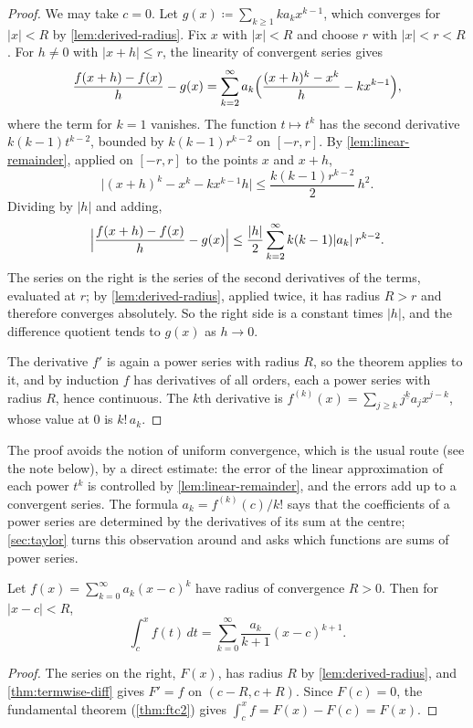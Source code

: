 \begin{proof}
We may take $c=0$. Let $g(x)\coloneqq\sum_{k\ge1}ka_kx^{k-1}$, which converges for $|x|<R$ by \cref{lem:derived-radius}. Fix $x$ with $|x|<R$ and choose $r$ with $|x|<r<R$. For $h\ne0$ with $|x+h|\le r$, the linearity of convergent series gives
\[
\frac{f(x+h)-f(x)}h-g(x)=\sum_{k=2}^\infty a_k\Bigl(\frac{(x+h)^k-x^k}h-kx^{k-1}\Bigr),
\]
where the term for $k=1$ vanishes. The function $t\mapsto t^k$ has the second derivative $k(k-1)t^{k-2}$, bounded by $k(k-1)r^{k-2}$ on $[-r,r]$. By \cref{lem:linear-remainder}, applied on $[-r,r]$ to the points $x$ and $x+h$,
\[
\bigl|(x+h)^k-x^k-kx^{k-1}h\bigr|\le\frac{k(k-1)r^{k-2}}2\,h^2 .
\]
Dividing by $|h|$ and adding,
\[
\Bigl|\frac{f(x+h)-f(x)}h-g(x)\Bigr|\le\frac{|h|}2\sum_{k=2}^\infty k(k-1)|a_k|\,r^{k-2} .
\]
The series on the right is the series of the second derivatives of the terms, evaluated at $r$; by \cref{lem:derived-radius}, applied twice, it has radius $R>r$ and therefore converges absolutely. So the right side is a constant times $|h|$, and the difference quotient tends to $g(x)$ as $h\to0$.

The derivative $f'$ is again a power series with radius $R$, so the theorem applies to it, and by induction $f$ has derivatives of all orders, each a power series with radius $R$, hence continuous. The $k$th derivative is $f^{(k)}(x)=\sum_{j\ge k}j^{\underline k}a_jx^{j-k}$, whose value at $0$ is $k!\,a_k$.
\end{proof}

The proof avoids the notion of uniform convergence, which is the usual route (see the note below), by a direct estimate: the error of the linear approximation of each power $t^k$ is controlled by \cref{lem:linear-remainder}, and the errors add up to a convergent series. The formula $a_k=f^{(k)}(c)/k!$ says that the coefficients of a power series are determined by the derivatives of its sum at the centre; \cref{sec:taylor} turns this observation around and asks which functions are sums of power series.

\begin{corollary}
\label{cor:termwise-int}
Let $f(x)=\sum_{k=0}^\infty a_k(x-c)^k$ have radius of convergence $R>0$. Then for $|x-c|<R$,
\[
\int_c^xf(t)\,dt=\sum_{k=0}^\infty\frac{a_k}{k+1}(x-c)^{k+1}.
\]
\end{corollary}

\begin{proof}
The series on the right, $F(x)$, has radius $R$ by \cref{lem:derived-radius}, and \cref{thm:termwise-diff} gives $F'=f$ on $(c-R,c+R)$. Since $F(c)=0$, the fundamental theorem (\cref{thm:ftc2}) gives $\int_c^xf=F(x)-F(c)=F(x)$.
\end{proof}

